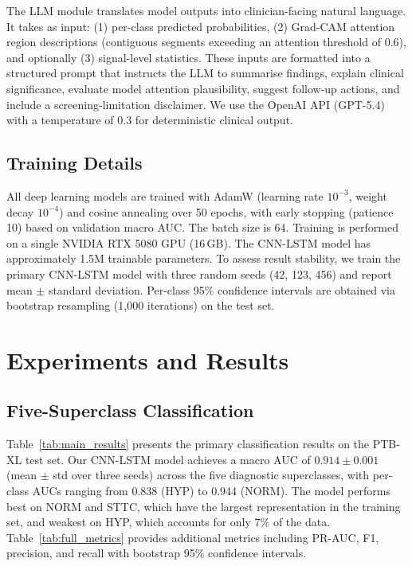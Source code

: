 \documentclass[10pt]{article}
\begin{document}
The LLM module translates model outputs into clinician-facing natural language. It takes as input: (1) per-class predicted probabilities, (2) Grad-CAM attention region descriptions (contiguous segments exceeding an attention threshold of 0.6), and optionally (3) signal-level statistics. These inputs are formatted into a structured prompt that instructs the LLM to summarise findings, explain clinical significance, evaluate model attention plausibility, suggest follow-up actions, and include a screening-limitation disclaimer. We use the OpenAI API (GPT-5.4) with a temperature of 0.3 for deterministic clinical output.

\subsection{Training Details}

All deep learning models are trained with AdamW (learning rate $10^{-3}$, weight decay $10^{-4}$) and cosine annealing over 50 epochs, with early stopping (patience 10) based on validation macro AUC. The batch size is 64. Training is performed on a single NVIDIA RTX 5080 GPU (16\,GB). The CNN-LSTM model has approximately 1.5M trainable parameters. To assess result stability, we train the primary CNN-LSTM model with three random seeds (42, 123, 456) and report mean $\pm$ standard deviation. Per-class 95\% confidence intervals are obtained via bootstrap resampling (1,000 iterations) on the test set.

\section{Experiments and Results}

\subsection{Five-Superclass Classification}

Table~\ref{tab:main_results} presents the primary classification results on the PTB-XL test set. Our CNN-LSTM model achieves a macro AUC of $0.914 \pm 0.001$ (mean $\pm$ std over three seeds) across the five diagnostic superclasses, with per-class AUCs ranging from 0.838 (HYP) to 0.944 (NORM). The model performs best on NORM and STTC, which have the largest representation in the training set, and weakest on HYP, which accounts for only 7\% of the data. Table~\ref{tab:full_metrics} provides additional metrics including PR-AUC, F1, precision, and recall with bootstrap 95\% confidence intervals.
\end{document}
